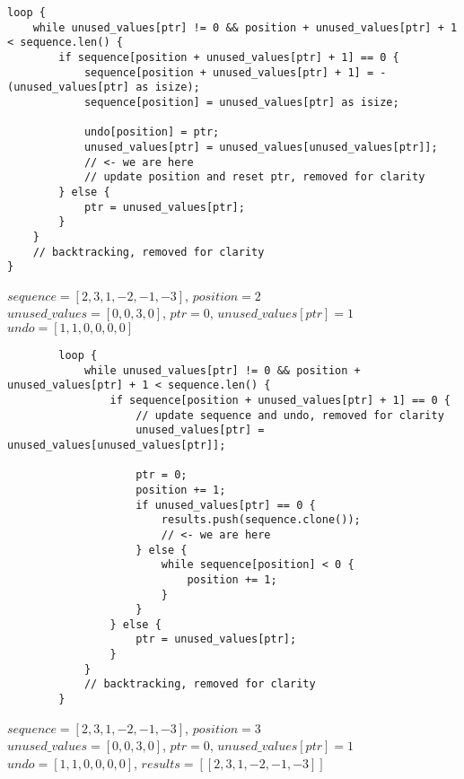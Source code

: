 \begin{frame}[fragile]
    \begin{verbatim}
loop {
    while unused_values[ptr] != 0 && position + unused_values[ptr] + 1 < sequence.len() {
        if sequence[position + unused_values[ptr] + 1] == 0 {
            sequence[position + unused_values[ptr] + 1] = -(unused_values[ptr] as isize);
            sequence[position] = unused_values[ptr] as isize;
            
            undo[position] = ptr;
            unused_values[ptr] = unused_values[unused_values[ptr]];
            // <- we are here
            // update position and reset ptr, removed for clarity
        } else {
            ptr = unused_values[ptr];
        }
    }
    // backtracking, removed for clarity
}
    \end{verbatim}
    $sequence = [2, 3, 1, -2, -1, -3]$, $position = 2$\\
    $unused\_values = [0, 0, 3, 0]$, $ptr = 0$, $unused\_values[ptr] = 1$\\
    $undo = [1, 1, 0, 0, 0, 0]$
\end{frame}
\begin{frame}[fragile]
    \begin{verbatim}
        loop {
            while unused_values[ptr] != 0 && position + unused_values[ptr] + 1 < sequence.len() {
                if sequence[position + unused_values[ptr] + 1] == 0 {
                    // update sequence and undo, removed for clarity
                    unused_values[ptr] = unused_values[unused_values[ptr]];
                    
                    ptr = 0;
                    position += 1;
                    if unused_values[ptr] == 0 {
                        results.push(sequence.clone());
                        // <- we are here
                    } else {
                        while sequence[position] < 0 {
                            position += 1;
                        }
                    }
                } else {
                    ptr = unused_values[ptr];
                }
            }
            // backtracking, removed for clarity
        }
    \end{verbatim}
    $sequence = [2, 3, 1, -2, -1, -3]$, $position = 3$\\
    $unused\_values = [0, 0, 3, 0]$, $ptr = 0$, $unused\_values[ptr] = 1$\\
    $undo = [1, 1, 0, 0, 0, 0]$, $results = [[2, 3, 1, -2, -1, -3]]$
\end{frame}
